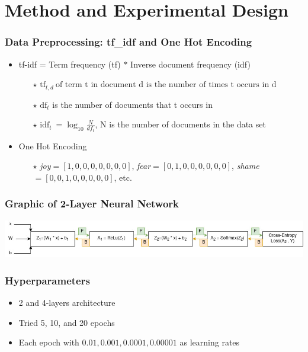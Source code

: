 \documentclass[aspectratio=169]{beamer}
\begin{document}
\section{Method and Experimental Design}
\begin{frame}
\frametitle{Data Preprocessing: tf\_idf and One Hot Encoding}

\begin{itemize}

\item tf-idf = Term frequency (tf) $*$ Inverse document frequency (idf)

\begin{itemize}
\setlength\itemsep{0.4em}
\item [$\star$] $ \text{tf}_{t,d} \: \text{of term t in document d is the number of times t occurs in d} $
\item [$\star$] $\text{df}_t$ is the number of documents that t occurs in


\item [$\star$] $ \text{idf}_t \:=\log_{10}\frac{N}{df_t}$, N is the number of documents in the data set
\end{itemize}
\setlength\itemsep{0.8em}
\item One Hot Encoding

\begin{itemize}
\item [$\star$] \emph{joy}$=[1,0,0,0,0,0,0,0]$, \emph{fear}$=[0,1,0,0,0,0,0,0]$, \emph{shame}$=[0,0,1,0,0,0,0,0]$, etc.
\end{itemize}
\end{itemize}
\end{frame}

\begin{frame}
\frametitle{Graphic of 2-Layer Neural Network}

\includegraphics[scale=0.5]{Method_TeamLab.jpg}

\end{frame}

\begin{frame}
\frametitle{Hyperparameters}
\begin{itemize}

\item 2 and 4-layers architecture
\item Tried 5, 10, and 20 epochs
\item Each epoch with $0.01, 0.001, 0.0001, 0.00001$ as learning rates

\end{itemize}
\end{frame}
\end{document}
